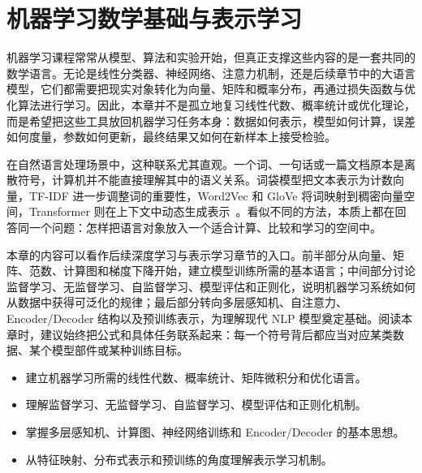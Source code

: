 \chapter{机器学习数学基础与表示学习}

\providecommand{\sourcefigureplaceholder}[2]{%
  \begin{figure}[htbp]
    \centering
    \fbox{%
      \begin{minipage}[c][4.2cm][c]{0.82\linewidth}
        \centering
        图占位：#2\\[0.5em]
        \footnotesize 原图源：\texttt{\detokenize{#1}}
      \end{minipage}
    }
    \caption{#2（占位）}
  \end{figure}
}

\noindent 机器学习课程常常从模型、算法和实验开始，但真正支撑这些内容的是一套共同的数学语言。无论是线性分类器、神经网络、注意力机制，还是后续章节中的大语言模型，它们都需要把现实对象转化为向量、矩阵和概率分布，再通过损失函数与优化算法进行学习。因此，本章并不是孤立地复习线性代数、概率统计或优化理论，而是希望把这些工具放回机器学习任务本身：数据如何表示，模型如何计算，误差如何度量，参数如何更新，最终结果又如何在新样本上接受检验。

在自然语言处理场景中，这种联系尤其直观。一个词、一句话或一篇文档原本是离散符号，计算机并不能直接理解其中的语义关系。词袋模型把文本表示为计数向量，TF-IDF 进一步调整词的重要性，Word2Vec 和 GloVe 将词映射到稠密向量空间，Transformer 则在上下文中动态生成表示~\cite{ManningEtAl2008IR,MikolovEtAl2013Word2Vec,PenningtonEtAl2014GloVe,VaswaniEtAl2017Transformer}。看似不同的方法，本质上都在回答同一个问题：怎样把语言对象放入一个适合计算、比较和学习的空间中。

本章的内容可以看作后续深度学习与表示学习章节的入口。前半部分从向量、矩阵、范数、计算图和梯度下降开始，建立模型训练所需的基本语言；中间部分讨论监督学习、无监督学习、自监督学习、模型评估和正则化，说明机器学习系统如何从数据中获得可泛化的规律；最后部分转向多层感知机、自注意力、Encoder/Decoder 结构以及预训练表示，为理解现代 NLP 模型奠定基础。阅读本章时，建议始终把公式和具体任务联系起来：每一个符号背后都应当对应某类数据、某个模型部件或某种训练目标。

\begin{learninggoals}
  \begin{itemize}
    \item 建立机器学习所需的线性代数、概率统计、矩阵微积分和优化语言。
    \item 理解监督学习、无监督学习、自监督学习、模型评估和正则化机制。
    \item 掌握多层感知机、计算图、神经网络训练和 Encoder/Decoder 的基本思想。
    \item 从特征映射、分布式表示和预训练的角度理解表示学习机制。
  \end{itemize}
\end{learninggoals}



